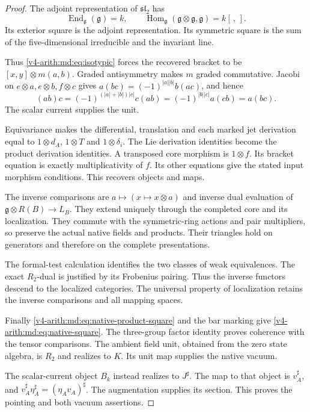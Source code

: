 \begin{proof}
The adjoint representation of $\mathfrak{sl}_2$ has
\[
 \operatorname{End}_{\mathfrak g}(\mathfrak g)=k,
 \qquad\operatorname{Hom}_{\mathfrak g}
       (\mathfrak g\otimes\mathfrak g,\mathfrak g)=k[\,,\,].
\]
Its exterior square is the adjoint representation.
Its symmetric square is the sum of the five-dimensional
irreducible and the invariant line.

Thus
\eqref{v4-arith:md:eq:isotypic} forces the recovered
bracket to be $[x,y]\otimes m(a,b)$.
Graded antisymmetry makes $m$ graded commutative.
Jacobi on $e\otimes a,e\otimes b,f\otimes c$ gives
$a(bc)=(-1)^{|a||b|}b(ac)$, and hence
\[
 (ab)c=(-1)^{(|a|+|b|)|c|}c(ab)
       =(-1)^{|b||c|}a(cb)=a(bc).
\]
The scalar current supplies the unit.

Equivariance makes the differential, translation and
each marked jet derivation equal to $1\otimes d_A$,
$1\otimes T$ and $1\otimes\delta_i$.
The Lie derivation identities become the product
derivation identities. A transposed core morphism
is $1\otimes f$. Its bracket equation is exactly
multiplicativity of $f$. Its other equations give
the stated input morphism conditions.
This recovers objects and maps.

The inverse comparisons are $a\mapsto(x\mapsto
x\otimes a)$ and inverse dual evaluation of
$\mathfrak g\otimes R(B)\to L_B$.
They extend uniquely through the completed core
and its localization. They commute with the
symmetric-ring actions and pair multipliers, so
preserve the actual native fields and products.
Their triangles hold on generators and therefore
on the complete presentations.

The formal-test calculation identifies the two
classes of weak equivalences. The exact $R_2$-dual
is justified by its Frobenius pairing. Thus the
inverse functors descend to the localized categories.
The universal property of localization retains the
inverse comparisons and all mapping spaces.

Finally \eqref{v4-arith:md:eq:native-product-square}
and the bar marking give
\eqref{v4-arith:md:eq:native-square}. The three-group
factor identity proves coherence with the tensor
comparisons. The ambient field unit, obtained from
the zero state algebra, is $R_2$ and realizes to
$K$. Its unit map supplies the native vacuum.

The scalar-current object $B_k$ instead realizes
to $J^\sharp$. The map to that object is
$v_A^\sharp$, and
$v_A^\sharp\eta_A^\sharp=(\eta_Av_A)^\sharp$.
The augmentation supplies its section. This proves
the pointing and both vacuum assertions.
\end{proof}

